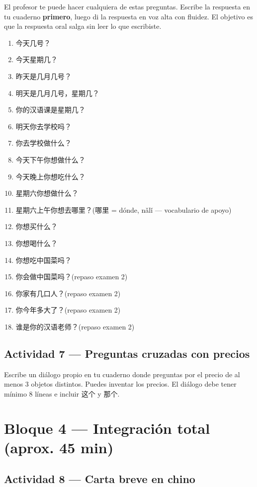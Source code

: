 \documentclass[12pt, a4paper]{article}
\begin{document}
El profesor te puede hacer cualquiera de estas preguntas. Escribe la respuesta en tu cuaderno \textbf{primero}, luego di la respuesta en voz alta con fluidez. El objetivo es que la respuesta oral salga sin leer lo que escribiste.

\begin{enumerate}[leftmargin=1.5cm]
\item 今天几号？
\item 今天星期几？
\item 昨天是几月几号？
\item 明天是几月几号，星期几？
\item 你的汉语课是星期几？
\item 明天你去学校吗？
\item 你去学校做什么？
\item 今天下午你想做什么？
\item 今天晚上你想吃什么？
\item 星期六你想做什么？
\item 星期六上午你想去哪里？\quad (哪里 = dónde, nǎlǐ — vocabulario de apoyo)
\item 你想买什么？
\item 你想喝什么？
\item 你想吃中国菜吗？
\item 你会做中国菜吗？\quad (repaso examen 2)
\item 你家有几口人？\quad (repaso examen 2)
\item 你今年多大了？\quad (repaso examen 2)
\item 谁是你的汉语老师？\quad (repaso examen 2)
\end{enumerate}

\subsection{Actividad 7 — Preguntas cruzadas con precios}

Escribe un diálogo propio en tu cuaderno donde preguntas por el precio de al menos 3 objetos distintos. Puedes inventar los precios. El diálogo debe tener mínimo 8 líneas e incluir 这个 y 那个.

\section{Bloque 4 — Integración total (aprox. 45 min)}

\subsection{Actividad 8 — Carta breve en chino}
\end{document}
